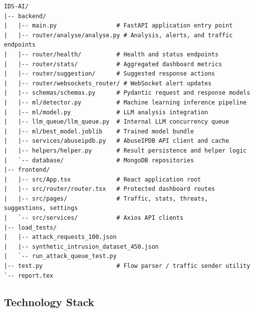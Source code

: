 \documentclass[12pt,a4paper]{report}
\begin{document}
\begin{lstlisting}[style=bashstyle, caption={Project directory structure}]
IDS-AI/
|-- backend/
|   |-- main.py                 # FastAPI application entry point
|   |-- router/analyse/analyse.py # Analysis, alerts, and traffic endpoints
|   |-- router/health/          # Health and status endpoints
|   |-- router/stats/           # Aggregated dashboard metrics
|   |-- router/suggestion/      # Suggested response actions
|   |-- router/websockets_router/ # WebSocket alert updates
|   |-- schemas/schemas.py      # Pydantic request and response models
|   |-- ml/detector.py          # Machine learning inference pipeline
|   |-- ml/model.py             # LLM analysis integration
|   |-- llm_queue/llm_queue.py  # Internal LLM concurrency queue
|   |-- ml/best_model.joblib    # Trained model bundle
|   |-- services/abuseipdb.py   # AbuseIPDB API client and cache
|   |-- helpers/helper.py       # Result persistence and helper logic
|   `-- database/               # MongoDB repositories
|-- frontend/
|   |-- src/App.tsx             # React application root
|   |-- src/router/router.tsx   # Protected dashboard routes
|   |-- src/pages/              # Traffic, stats, threats, suggestions, settings
|   `-- src/services/           # Axios API clients
|-- load_tests/
|   |-- attack_requests_100.json
|   |-- synthetic_intrusion_dataset_450.json
|   `-- run_attack_queue_test.py
|-- test.py                     # Flow parser / traffic sender utility
`-- report.tex
\end{lstlisting}

\subsection{Technology Stack}
\end{document}
